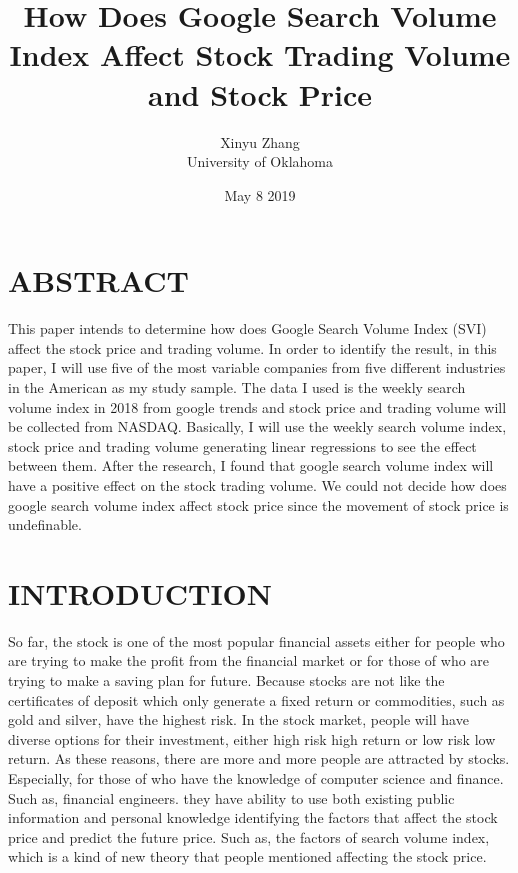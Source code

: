 \documentclass[12pt,english]{article}
\title{How Does Google Search Volume Index Affect Stock Trading Volume and Stock Price }
\date{May 8 2019}
\author{Xinyu Zhang\\ University of Oklahoma}
\begin{document}
\maketitle

\section{ABSTRACT}
This paper intends to determine how does Google Search Volume Index (SVI) affect the stock price and trading volume. In order to identify the result, in this paper, I will use five of the most variable companies from five different industries in the American as my study sample. The data I used is the weekly search volume index in 2018 from google trends and stock price and trading volume will be collected from NASDAQ. Basically, I will use the weekly search volume index, stock price and trading volume generating linear regressions to see the effect between them. After the research, I found that google search volume index will have a positive effect on the stock trading volume. We could not decide how does google search volume index affect stock price since the movement of stock price is undefinable.
\newline

\section{INTRODUCTION} 
So far, the stock is one of the most popular financial assets either for people who are trying to make the profit from the financial market or for those of who are trying to make a saving plan for future. Because stocks are not like the certificates of deposit which only generate a fixed return or commodities, such as gold and silver, have the highest risk. In the stock market, people will have diverse options for their investment, either high risk high return or low risk low return. As these reasons, there are more and more people are attracted by stocks. Especially, for those of who have the knowledge of computer science and finance. Such as, financial engineers. they have ability to use both existing public information and personal knowledge identifying the factors that affect the stock price and predict the future price. Such as, the factors of search volume index, which is a kind of new theory that people mentioned affecting the stock price.
\newline
\end{document}
